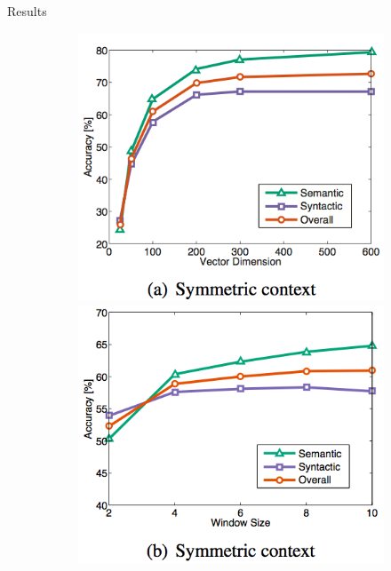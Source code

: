 \begin{frame}{Results}
  \begin{figure}
    \begin{figure}
      \includegraphics[scale=0.27]{images/analogy1.png}
      \includegraphics[scale=0.27]{images/analogy2.png}

\end{figure}
\end{figure}
\end{frame}

